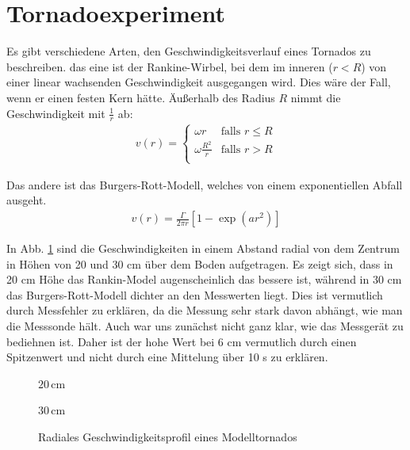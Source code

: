 \documentclass[12pt,a4paper,titlepage,headinclude,bibtotoc]{scrartcl}
\begin{document}
\section{Tornadoexperiment}
Es gibt verschiedene Arten, den Geschwindigkeitsverlauf eines Tornados zu beschreiben.
das eine ist der Rankine-Wirbel, bei dem im inneren ($r<R$) von einer linear wachsenden Geschwindigkeit ausgegangen wird.
Dies wäre der Fall, wenn er einen festen Kern hätte.
Äußerhalb des Radius $R$ nimmt die Geschwindigkeit mit $\frac{1}{r}$ ab:
\begin{align}
	v(r) = 
	\begin{cases}
		\omega r & \text{falls } r \leq R\\
		\omega \frac{R^2}{r} & \text{falls } r > R\\
	\end{cases}
\end{align}


Das andere ist das Burgers-Rott-Modell, welches von einem exponentiellen Abfall ausgeht.
\begin{align}
	v(r) = \frac{\Gamma}{2\pi r}\left[1-\exp\left(a r^2\right)\right]
\end{align}

In Abb. \ref{fig:tornado} sind die Geschwindigkeiten in einem Abstand radial von dem Zentrum in Höhen von 20 und 30 cm über dem Boden aufgetragen.
Es zeigt sich, dass in 20 cm Höhe das Rankin-Model augenscheinlich das bessere ist, während in 30 cm das Burgers-Rott-Modell dichter an den Messwerten liegt.
Dies ist vermutlich durch Messfehler zu erklären, da die Messung sehr stark davon abhängt, wie man die Messsonde hält.
Auch war uns zunächst nicht ganz klar, wie das Messgerät zu bediehnen ist.
Daher ist der hohe Wert bei 6 cm vermutlich durch einen Spitzenwert und nicht durch eine Mittelung über 10 s zu erklären.


 \begin{figure}[!htb]
	\begin{minipage}{0.5\textwidth}	
		\resizebox{\textwidth}{!}{   		
   		}
   		\caption*{$20\,$cm}
   \end{minipage}   
   \begin{minipage}{0.5\textwidth}   		
		\resizebox{\textwidth}{!}{   		
   		}
   		\caption*{$30\,$cm}
   \end{minipage}
   \caption{Radiales Geschwindigkeitsprofil eines Modelltornados\label{fig:tornado}}
 \end{figure}
\end{document}
